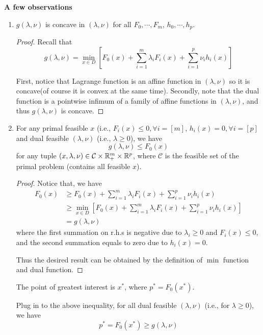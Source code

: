 \vspace{0.3cm}
\noindent\textbf{A few observations}
\begin{enumerate}
	
	\item $g(\lambda, \nu)$ is concave in $(\lambda, \nu)$ for all $F_0,\cdots,F_m$, $h_0,\cdots,h_p$.
	
	\begin{proof}
		Recall that
		$$g(\lambda, \nu) =\min_{x\in D}[F_0(x) + \sum^m_{i=1}\lambda_iF_i(x) + \sum^p_{i=1}\nu_ih_i(x) ]$$
		
		First, notice that Lagrange function is an affine function in $(\lambda, \nu)$ so it is concave(of course it is convex at the same time). Secondly, note that the dual function is a pointwise infimum of a family of affine functions in $(\lambda, \nu)$, and thus $g(\lambda, \nu)$ is concave.
	\end{proof}
	
	\item For any primal feasible $x$ (i.e., $F_i(x)\leq 0, \forall i = [m]$, $h_i(x)= 0,\forall i = [p]$ and dual feasible $(\lambda, \nu)$ (i.e., $\lambda \geq 0$), we have
	$$g(\lambda, \nu)\leq F_0(x)$$
	for any tuple $(x, \lambda, \nu) \in \mathcal{C}\times \mathbb{R}^m_+\times \mathbb{R}^p$, where $\mathcal{C}$ is the feasible set of the primal problem (contains all feasible $x$).
	
	\begin{proof}
		Notice that, we have
		\begin{align*}
			F_0(x) &\geq F_0(x) + \sum^m_{i=1}\lambda_iF_i(x) + \sum^p_{i=1}\nu_ih_i(x)\\
			&\geq \min_{x\in D} [F_0(x) + \sum^m_{i=1}\lambda_iF_i(x) + \sum^p_{i=1}\nu_ih_i(x)] \\
			&= g(\lambda, \nu)
		\end{align*}
		where the first summation on r.h.s is negative due to $\lambda_i\geq 0$ and $F_i(x)\leq 0$, and the second summation equals to zero due to $h_i(x)=0$. 
		
		Thus the desired result can be obtained by the definition of $\min$ function and dual function.
	\end{proof}
	
	The point of greatest interest is $x^*$, where $p^* = F_0(x^*)$.
	
	Plug in to the above inequality, for all dual feasible $(\lambda, \nu)$ (i.e., for $\lambda \geq 0$), we have
	\begin{equation*}
		p^* = F_0(x^*) \geq g(\lambda, \nu)
	\end{equation*}
	

\end{enumerate}
